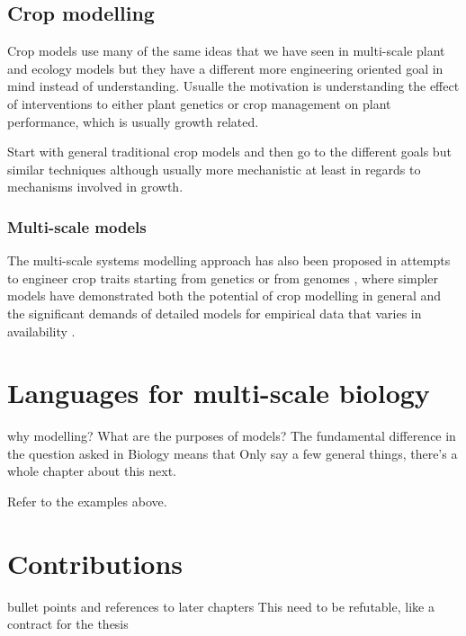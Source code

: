 \documentclass[phd]{infthesis}
\begin{document}
\subsection{Crop modelling}
Crop models use many of the same ideas that we have seen in multi-scale plant
and ecology models but they have a different more engineering oriented goal in
mind instead of understanding. Usualle the motivation is understanding the
effect of interventions to either plant genetics or crop management on plant
performance, which is usually growth related.

Start with general traditional crop models and then go to the
different goals but similar techniques although usually more mechanistic at
least in regards to mechanisms involved in growth.


\subsubsection*{Multi-scale models}
The multi-scale systems modelling approach has also been proposed in attempts to
engineer crop traits starting from genetics or from genomes
\citep{welch_merging_2005, yin_applying_nodate, yin_modelling_2010,
  parent_can_2014, wu_connecting_2016, chenu_integrating_2018}, where simpler
models have demonstrated both the potential of crop modelling in general and the
significant demands of detailed models for empirical data that varies in
availability \citep{hammer_models_2006,asseng_uncertainty_2013}.


\section{Languages for multi-scale biology}
why modelling? What are the purposes of models?
The fundamental difference in the question asked in Biology means that 
Only say a few general things, there's a whole chapter about this next.

Refer to the examples above.

\section{Contributions}
bullet points and references to later chapters
This need to be refutable, like a contract for the thesis

\printbibliography[heading=bibintoc]
\end{document}
